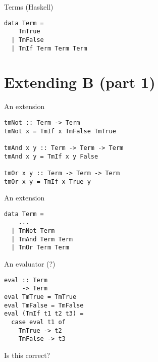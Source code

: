 \documentclass[aspectration=169]{beamer}
\begin{document}
\begin{frame}[fragile]
  \begin{center}
Terms (Haskell)
  \end{center}
  \begin{verbatim}
data Term =
    TmTrue
  | TmFalse
  | TmIf Term Term Term
  \end{verbatim}
\end{frame} 

\section{Extending B (part 1)}

\begin{frame}[fragile]
  \begin{center}
    An extension
  \end{center}
  \begin{verbatim}
tmNot :: Term -> Term
tmNot x = TmIf x TmFalse TmTrue

tmAnd x y :: Term -> Term -> Term
tmAnd x y = TmIf x y False

tmOr x y :: Term -> Term -> Term
tmOr x y = TmIf x True y
  \end{verbatim}
\end{frame} 

\begin{frame}[fragile]
  \begin{center}
    An extension
  \end{center}
  \begin{verbatim}
data Term =
    ...
  | TmNot Term
  | TmAnd Term Term
  | TmOr Term Term
  \end{verbatim}
\end{frame} 

\begin{frame}[fragile]
  \begin{center}
An evaluator (?)
  \end{center}
  \begin{verbatim}
eval :: Term 
     -> Term
eval TmTrue = TmTrue
eval TmFalse = TmFalse
eval (TmIf t1 t2 t3) =
  case eval t1 of
    TmTrue -> t2
    TmFalse -> t3
  \end{verbatim}
\end{frame} 

\begin{frame}[c]
  \begin{center}
Is this correct?
  \end{center}
\end{frame}
\end{document}
